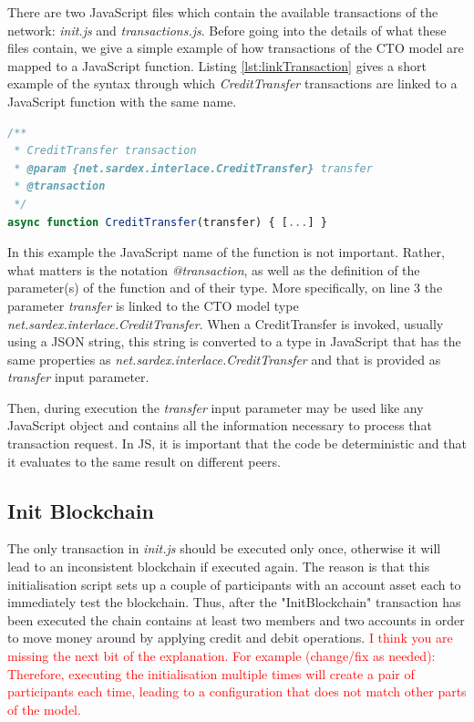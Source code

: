 There are two JavaScript files which contain the available transactions of the network: \textit{init.js} and \textit{transactions.js}. Before going into the details of what these files contain, we give a simple example of how transactions of the CTO model are mapped to a JavaScript function. Listing \ref{lst:linkTransaction} gives a short example of the syntax through which \textit{CreditTransfer} transactions are linked to a JavaScript function with the same name.

\begin{center}
\begin{minipage}{0.8\textwidth}
\small
\begin{lstlisting}[language=javascript,firstnumber=1,caption={\bf\small Connection of JavaScript function CreditTransfer to CTO-model transaction type}, captionpos=b,label=lst:linkTransaction]
/**
 * CreditTransfer transaction
 * @param {net.sardex.interlace.CreditTransfer} transfer
 * @transaction
 */
async function CreditTransfer(transfer) { [...] }
\end{lstlisting}
\end{minipage}
\end{center}

In this example the JavaScript name of the function is not important. Rather, what matters is the notation \textit{@transaction}, as well as the definition of the parameter(s) of the function and of their type. More specifically, on line 3 the parameter \textit{transfer} is linked to the CTO model type \textit{net.sardex.interlace.CreditTransfer}. When a CreditTransfer is invoked, usually using a JSON string, this string is converted to a type in JavaScript that has the same properties as \textit{net.sardex.interlace.CreditTransfer} and that is provided as \textit{transfer} input parameter.

Then, during execution the \textit{transfer} input parameter may be used like any JavaScript object and contains all the information necessary to process that transaction request. In JS, it is important that the code be deterministic and that it evaluates to the same result on different peers.

\subsection{Init Blockchain}

The only transaction in \textit{init.js} should be executed only once, otherwise it will lead to an inconsistent blockchain if executed again. The reason is that this initialisation script sets up a couple of participants with an account asset each to immediately test the blockchain. Thus, after the "InitBlockchain" transaction has been executed the chain contains at least two members and two accounts in order to move money around by applying credit and debit operations. \textcolor{red}{I think you are missing the next bit of the explanation. For example (change/fix as needed): Therefore, executing the initialisation multiple times will create a pair of participants each time, leading to a configuration that does not match other parts of the model.}

